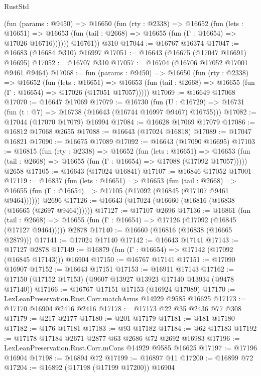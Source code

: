 \begin{lexlean}{RustStd}
\begin{coremodule}
          (fun (params : @9450) =>
          @16650
            (fun (rty : @2338) =>
            @16652
              (fun (lets : @16651) =>
              @16653 (fun (tail : @2668) => @16655 (fun (Γ : @16654) => @17026 @16716))))))
        @16761))
    @310
@17044 := @16767 @16374
@17047 := @16683 (@16684 @310) @16997
@17051 := @16643 (@16675 (@17047 @16691) @16695)
@17052 := @16707 @310
@17057 := @16704 (@16706 @17052 @17001 @9461 @9464)
@17068 := fun (params : @9450) =>
  @16650
    (fun (rty : @2338) =>
    @16652
      (fun (lets : @16651) =>
      @16653 (fun (tail : @2668) => @16655 (fun (Γ : @16654) => @17026 (@17051 @17057)))))
@17069 := @16649 @17068
@17070 := @16647 @17069
@17079 := @16730
    (fun (U : @16729) => @16731 (fun (t : @7) => @16738 (@16643 (@16744 @16997 @9467) @16755)))
@17082 := @17044 (@17070 @17079) @16994
@17084 := @16628 @17069 @17079
@17086 := @16812 @17068 @2655
@17088 := @16643 (@17024 @16818)
@17089 := @17047 @16821
@17090 := @16675 @17089
@17092 := @16643 (@17090 @16695)
@17103 := @16815
    (fun (rty : @2338) =>
    @16652
      (fun (lets : @16651) =>
      @16653 (fun (tail : @2668) => @16655 (fun (Γ : @16654) => @17088 (@17092 @17057)))))
    @2658
@17105 := @16643 (@17024 @16841)
@17107 := @16846 @17052 @17001
@17119 := @16837
    (fun (lets : @16651) =>
    @16653
      (fun (tail : @2668) =>
      @16655 (fun (Γ : @16654) => @17105 (@17092 (@16845 (@17107 @9461 @9464))))))
    @2696
@17126 := @16643 (@17024 (@16660 (@16816 (@16838 (@16665 (@2697 @9464))))))
@17127 := @17107 @2696
@17136 := @16861
    (fun (tail : @2668) => @16655 (fun (Γ : @16654) => @17126 (@17092 (@16845 (@17127 @9464)))))
    @2878
@17140 := @16660 (@16816 (@16838 (@16665 @2879)))
@17141 := @17024 @17140
@17142 := @16643 @17141
@17143 := @17127 @2878
@17149 := @16879 (fun (Γ : @16654) => @17142 (@17092 (@16845 @17143))) @16904
@17150 := @16767 @17141
@17151 := @17090 @16907
@17152 := @16643 @17151
@17153 := @16911 @17143
@17162 := @17150 (@17152 @17153) (@9607 @13927 @13923 @17140 @13934 (@9478 @17140))
@17166 := @16767 @17151 @17153 (@16924 @17089)
@17170 := LexLeanPreservation.Rust.Corr.matchArms @14929 @9585 @16625
@17173 := @17170 @16904 @2416 @2416
@17178 := @17173 @22 @35 @2436 @77 @308
@17179 := @217 @2177
@17180 := @201 @17179
@17181 := @181 @17180
@17182 := @176 @17181
@17183 := @93 @17182
@17184 := @62 @17183
@17192 := @17178 @17184 @2671 @2877 @63 @2686 @72 @2692 @16983
@17196 := LexLeanPreservation.Rust.Corr.mCons @14929 @9585 @16625
@17197 := @17196 @16904
@17198 := @16894 @72
@17199 := @16897 @11
@17200 := @16899 @72
@17204 := @16892 (@17198 (@17199 @17200)) @16904

\end{coremodule}
\end{lexlean}
